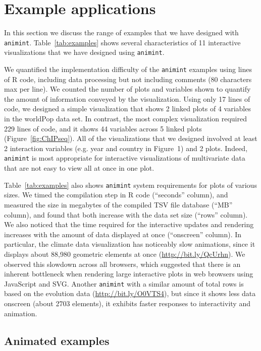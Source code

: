 \documentclass[journal]{vgtc}\usepackage[]{graphicx}\usepackage[]{color}
\begin{document}
\section{Example applications}

In this section we discuss the range of examples that we have designed
with \texttt{animint}. Table~\ref{tab:examples} shows several characteristics
of 11 interactive visualizations that we have designed using
\texttt{animint}.

We quantified the implementation difficulty of the \texttt{animint} examples
using lines of R code, including data processing but not including
comments (80 characters max per line). We counted the number of plots
and variables shown to quantify the amount of information conveyed by
the visualization. Using only 17 lines of code, we designed a simple
visualization that shows 2 linked plots of 4 variables in the worldPop
data set. In contrast, the most complex visualization required 229
lines of code, and it shows 44 variables across 5 linked plots
(Figure~\ref{fig:ChIPseq}). All of the visualizations that we designed
involved at least 2 interaction variables (e.g. year and country in
Figure~1) and 2 plots. Indeed, \texttt{animint} is most appropriate for
interactive visualizations of multivariate data that are not easy to
view all at once in one plot.

Table~\ref{tab:examples} also shows \texttt{animint} system requirements for
plots of various sizes. We timed the compilation step in R code
(``seconds'' column), and measured the size in megabytes of the
compiled TSV file database (``MB'' column), and found that both
increase with the data set size (``rows'' column).
We also noticed that the time required for the interactive updates and
rendering increases with the amount of data displayed at once
(``onscreen'' column). In particular, the climate data visualization
has noticeably slow animations, since it displays about 88,980
geometric elements at once (\url{http://bit.ly/QcUrhn}). We observed
this slowdown across all browsers, which suggested that there is an
inherent bottleneck when rendering large interactive plots in web
browsers using JavaScript and SVG. Another \texttt{animint} with a similar
amount of total rows is based on the evolution data
(\url{http://bit.ly/O0VTS4}), but since it shows less data onscreen
(about 2703 elements), it exhibits faster responses to interactivity
and animation.

\subsection{Animated examples}
\end{document}
